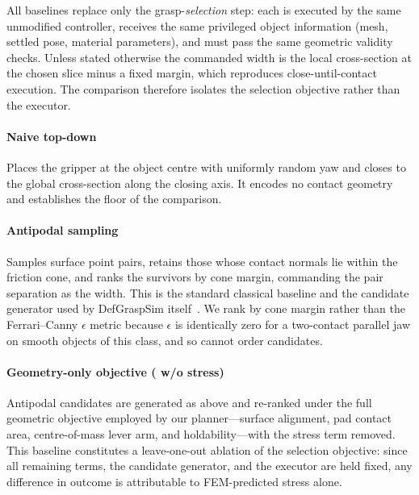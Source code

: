 
All baselines replace only the grasp-\emph{selection} step: each is executed by the same
unmodified controller, receives the same privileged object information (mesh, settled pose,
material parameters), and must pass the same geometric validity checks. Unless stated
otherwise the commanded width is the local cross-section at the chosen slice minus a fixed
margin, which reproduces close-until-contact execution. The comparison therefore isolates the
selection objective rather than the executor.

\paragraph{Naive top-down}
Places the gripper at the object centre with uniformly random yaw and closes to the global
cross-section along the closing axis. It encodes no contact geometry and establishes the floor
of the comparison.

\paragraph{Antipodal sampling}
Samples surface point pairs, retains those whose contact normals lie within the friction cone,
and ranks the survivors by cone margin, commanding the pair separation as the width. This is
the standard classical baseline and the candidate generator used by DefGraspSim
itself~\cite{defgraspsim}. We rank by cone margin rather than the Ferrari--Canny $\epsilon$
metric because $\epsilon$ is identically zero for a two-contact parallel jaw on smooth objects
of this class, and so cannot order candidates.

\paragraph{Geometry-only objective (\method{} w/o stress)}
Antipodal candidates are generated as above and re-ranked under the full geometric objective
employed by our planner---surface alignment, pad contact area, centre-of-mass lever arm, and
holdability---with the stress term removed. This baseline constitutes a leave-one-out ablation
of the selection objective: since all remaining terms, the candidate generator, and the
executor are held fixed, any difference in outcome is attributable to FEM-predicted stress
alone.

